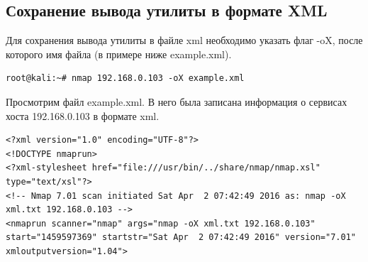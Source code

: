 \documentclass[10pt,a4paper]{report}
\begin{document}
\subsection{Сохранение вывода утилиты в формате XML}
Для сохранения вывода утилиты в файле xml необходимо указать флаг -oX, после которого имя файла (в примере ниже example.xml).
\begin{verbatim}
root@kali:~# nmap 192.168.0.103 -oX example.xml
\end{verbatim}
Просмотрим файл example.xml. В него была записана информация о сервисах хоста 192.168.0.103 в формате xml.
\begin{verbatim}
<?xml version="1.0" encoding="UTF-8"?>
<!DOCTYPE nmaprun>
<?xml-stylesheet href="file:///usr/bin/../share/nmap/nmap.xsl" type="text/xsl"?>
<!-- Nmap 7.01 scan initiated Sat Apr  2 07:42:49 2016 as: nmap -oX xml.txt 192.168.0.103 -->
<nmaprun scanner="nmap" args="nmap -oX xml.txt 192.168.0.103" start="1459597369" startstr="Sat Apr  2 07:42:49 2016" version="7.01" xmloutputversion="1.04">

\end{verbatim}
\end{document}
